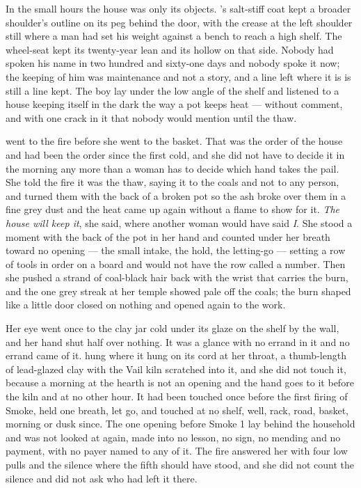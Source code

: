 In the small hours the house was only its objects. 's salt-stiff coat kept a broader shoulder's outline on its peg behind the door, with the crease at the left shoulder still where a man had set his weight against a bench to reach a high shelf. The wheel-seat kept its twenty-year lean and its hollow on that side. Nobody had spoken his name in two hundred and sixty-one days and nobody spoke it now; the keeping of him was maintenance and not a story, and a line left where it is is still a line kept. The boy lay under the low angle of the shelf and listened to a house keeping itself in the dark the way a pot keeps heat --- without comment, and with one crack in it that nobody would mention until the thaw.

\scenebreak

 went to the fire before she went to the basket. That was the order of the house and had been the order since the first cold, and she did not have to decide it in the morning any more than a woman has to decide which hand takes the pail. She told the fire it was the thaw, saying it to the coals and not to any person, and turned them with the back of a broken pot so the ash broke over them in a fine grey dust and the heat came up again without a flame to show for it. \emph{The house will keep it}, she said, where another woman would have said \emph{I}. She stood a moment with the back of the pot in her hand and counted under her breath toward no opening --- the small intake, the hold, the letting-go --- setting a row of tools in order on a board and would not have the row called a number. Then she pushed a strand of coal-black hair back with the wrist that carries the burn, and the one grey streak at her temple showed pale off the coals; the burn shaped like a little door closed on nothing and opened again to the work.

Her eye went once to the clay jar cold under its glaze on the shelf by the wall, and her hand shut half over nothing. It was a glance with no errand in it and no errand came of it.  hung where it hung on its cord at her throat, a thumb-length of lead-glazed clay with the Vail kiln scratched into it, and she did not touch it, because a morning at the hearth is not an opening and the hand goes to it before the kiln and at no other hour. It had been touched once before the first firing of Smoke, held one breath, let go, and touched at no shelf, well, rack, road, basket, morning or dusk since. The one opening before Smoke 1 lay behind the household and was not looked at again, made into no lesson, no sign, no mending and no payment, with no payer named to any of it. The fire answered her with four low pulls and the silence where the fifth should have stood, and she did not count the silence and did not ask who had left it there.

